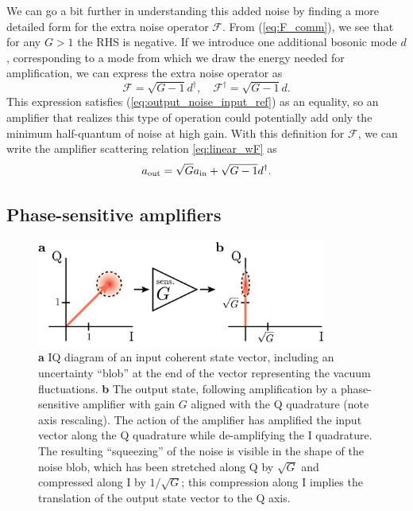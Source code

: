 We can go a bit further in understanding this added noise by finding a more detailed form for the extra noise operator $\mathcal{F}$.  From (\ref{eq:F_comm}), we see that for any $G > 1$ the RHS is negative.  If we introduce one additional bosonic mode $d$, corresponding to a mode from which we draw the energy needed for amplification, we can express the extra noise operator as
\begin{equation}
\mathcal{F} = \sqrt{G-1}d^\dagger, \quad \mathcal{F}^\dagger = \sqrt{G-1}d.
\end{equation}
This expression satisfies (\ref{eq:output_noise_input_ref}) as an equality, so an amplifier that realizes this type of operation could potentially add only the minimum half-quantum of noise at high gain.  With this definition for $\mathcal{F}$, we can write the amplifier scattering relation \eqref{eq:linear_wF} as
\begin{equation}
a_{\rm out} = \sqrt{G} a_{\rm in} + \sqrt{G-1} d^\dagger.
\end{equation}

\subsection{Phase-sensitive amplifiers}\label{s:phase_sens_amps}

\begin{figure}
\begin{center}
	\includegraphics[width = 3.75in]{paramps_chapter/lollipops_sens.png}
\end{center}
\caption[IQ diagram for phase-sensitive amplifier]{\textbf{a} IQ diagram of an input coherent state vector, including an uncertainty ``blob'' at the end of the vector representing the vacuum fluctuations.  \textbf{b} The output state, following amplification by a phase-sensitive amplifier with gain $G$ aligned with the Q quadrature (note axis rescaling).  The action of the amplifier has amplified the input vector along the Q quadrature while de-amplifying the I quadrature.  The resulting ``squeezing'' of the noise is visible in the shape of the noise blob, which has been stretched along Q by $\sqrt{G}$ and compressed along I by $1/\sqrt{G}$; this compression along I implies the translation of the output state vector to the Q axis.}
\label{fig:lollipops_sens}
\end{figure}

